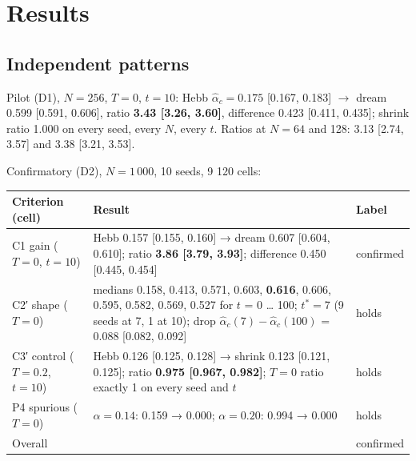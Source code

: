 \section{Results}\label{results}

\subsection{Independent patterns}\label{independent-patterns}

Pilot (D1), \(N = 256\), \(T = 0\), \(t = 10\): Hebb
\(\hat\alpha_c = 0.175\) {[}0.167, 0.183{]} \(\to\) dream 0.599
{[}0.591, 0.606{]}, ratio \textbf{3.43 {[}3.26, 3.60{]}}, difference
0.423 {[}0.411, 0.435{]}; shrink ratio 1.000 on every seed, every \(N\),
every \(t\). Ratios at \(N = 64\) and 128: 3.13 {[}2.74, 3.57{]} and
3.38 {[}3.21, 3.53{]}.

Confirmatory (D2), \(N = 1\,000\), 10 seeds, 9 120 cells:

{
\begin{longtable}[]{@{}
  >{\raggedright\arraybackslash}p{}
  >{\raggedright\arraybackslash}p{}
  >{\raggedright\arraybackslash}p{}@{}}
\toprule\noalign{}
\begin{minipage}[b]{\linewidth}\raggedright
Criterion (cell)
\end{minipage} & \begin{minipage}[b]{\linewidth}\raggedright
Result
\end{minipage} & \begin{minipage}[b]{\linewidth}\raggedright
Label
\end{minipage} \\
\midrule\noalign{}
\endhead
\bottomrule\noalign{}
\endlastfoot
C1 gain (\(T = 0\), \(t = 10\)) & Hebb 0.157 {[}0.155, 0.160{]} → dream
0.607 {[}0.604, 0.610{]}; ratio \textbf{3.86 {[}3.79, 3.93{]}};
difference 0.450 {[}0.445, 0.454{]} & confirmed \\
C2′ shape (\(T = 0\)) & medians 0.158, 0.413, 0.571, 0.603,
\textbf{0.616}, 0.606, 0.595, 0.582, 0.569, 0.527 for \(t\) = 0 \ldots{}
100; \(t^* = 7\) (9 seeds at 7, 1 at 10); drop
\(\hat\alpha_c(7) - \hat\alpha_c(100)\) = 0.088 {[}0.082, 0.092{]} &
holds \\
C3′ control (\(T = 0.2\), \(t = 10\)) & Hebb 0.126 {[}0.125, 0.128{]} →
shrink 0.123 {[}0.121, 0.125{]}; ratio \textbf{0.975 {[}0.967,
0.982{]}}; \(T = 0\) ratio exactly 1 on every seed and \(t\) & holds \\
P4 spurious (\(T = 0\)) & \(\alpha = 0.14\): 0.159 → 0.000;
\(\alpha = 0.20\): 0.994 → 0.000 & holds \\
Overall & & confirmed \\
\end{longtable}
}

